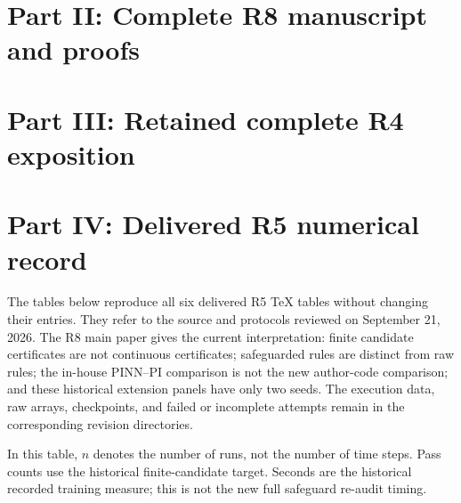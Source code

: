 \documentclass[ecta]{econsocart}
\renewcommand{\[}{\begingroup\small\ROpenDisplay}
\renewcommand{\]}{\RCloseDisplay\endgroup}
\theoremstyle{remark}
\begin{document}
\clearpage
\section*{Part II: Complete R8 manuscript and proofs}
\begingroup
\renewcommand{\theHsection}{r8.\arabic{section}}
\renewcommand{\theHequation}{r8.\arabic{section}.\arabic{equation}}

\begin{appendix}

\end{appendix}
\endgroup
\clearpage
\section*{Part III: Retained complete R4 exposition}
\begingroup
\renewcommand{\theHsection}{r4.\arabic{section}}
\renewcommand{\theHequation}{r4.\arabic{section}.\arabic{equation}}
\setcounter{section}{0}
\setcounter{equation}{0}
\setcounter{theorem}{0}
\setcounter{proposition}{0}
\setcounter{assumption}{0}
\setcounter{lemma}{0}
\setcounter{remark}{0}
\setcounter{example}{0}
\setcounter{table}{0}

\begin{appendix}

\end{appendix}
\endgroup
\clearpage
\section*{Part IV: Delivered R5 numerical record}
The tables below reproduce all six delivered R5 TeX tables without changing their entries. They refer to the source and protocols reviewed on September 21, 2026. The R8 main paper gives the current interpretation: finite candidate certificates are not continuous certificates; safeguarded rules are distinct from raw rules; the in-house PINN--PI comparison is not the new author-code comparison; and these historical extension panels have only two seeds. The execution data, raw arrays, checkpoints, and failed or incomplete attempts remain in the corresponding revision directories.

\begin{table}[htbp]\centering\small
\caption{Retained R5 NDU panel}

\par\smallskip\footnotesize In this table, $n$ denotes the number of runs, not the number of time steps. Pass counts use the historical finite-candidate target. Seconds are the historical recorded training measure; this is not the new full safeguard re-audit timing.
\end{table}
\end{document}
